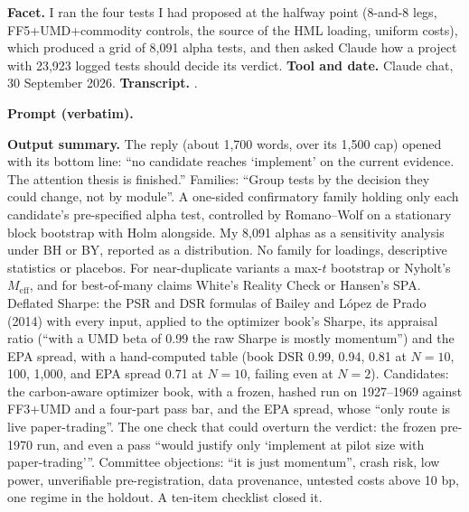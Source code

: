 \textbf{Facet.} I ran the four tests I had proposed at the halfway point (8-and-8 legs, FF5+UMD+commodity controls, the source of the HML loading, uniform costs), which produced a grid of 8,091 alpha tests, and then asked Claude how a project with 23,923 logged tests should decide its verdict. \textbf{Tool and date.} Claude chat, 30 September 2026. \textbf{Transcript.} .

\textbf{Prompt (verbatim).}
\begin{promptbox}

\end{promptbox}

\textbf{Output summary.} The reply (about 1,700 words, over its 1,500 cap) opened with its bottom line: ``no candidate reaches `implement' on the current evidence. The attention thesis is finished.'' Families: ``Group tests by the decision they could change, not by module''. A one-sided confirmatory family holding only each candidate's pre-specified alpha test, controlled by Romano--Wolf on a stationary block bootstrap with Holm alongside. My 8,091 alphas as a sensitivity analysis under BH or BY, reported as a distribution. No family for loadings, descriptive statistics or placebos. For near-duplicate variants a max-$t$ bootstrap or Nyholt's $M_{\mathrm{eff}}$, and for best-of-many claims White's Reality Check or Hansen's SPA. Deflated Sharpe: the PSR and DSR formulas of Bailey and L\'opez de Prado (2014) with every input, applied to the optimizer book's Sharpe, its appraisal ratio (``with a UMD beta of 0.99 the raw Sharpe is mostly momentum'') and the EPA spread, with a hand-computed table (book DSR 0.99, 0.94, 0.81 at $N=10$, 100, 1,000, and EPA spread 0.71 at $N=10$, failing even at $N=2$). Candidates: the carbon-aware optimizer book, with a frozen, hashed run on 1927--1969 against FF3+UMD and a four-part pass bar, and the EPA spread, whose ``only route is live paper-trading''. The one check that could overturn the verdict: the frozen pre-1970 run, and even a pass ``would justify only `implement at pilot size with paper-trading'''. Committee objections: ``it is just momentum'', crash risk, low power, unverifiable pre-registration, data provenance, untested costs above 10 bp, one regime in the holdout. A ten-item checklist closed it.

